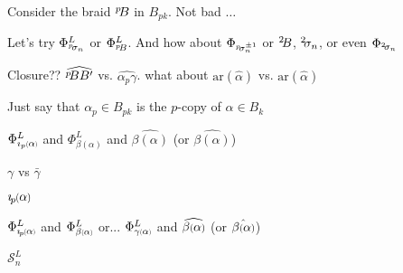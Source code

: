 \documentclass{amsart}
\newcommand{\pp}[2][-2]{\ensuremath ^{#2}\hspace*{#1 pt}}
\newcommand*{\smallp}[1]{\scalebox{.75}{\ensuremath#1}}
\newcommand*{\subsmallp}[1]{\scalebox{.5}{\ensuremath#1}}
\begin{document}
 Consider the braid $\pp p B$ in $B_{pk}$. Not bad $\ldots$

Let's try $\Phi_{\pp [-1.5]p \sigma_n}^L$ or $\Phi_{\pp [-1.5]p B}^L$. And how about $\Phi_{\pp[-1.5]p \sigma_n^{\pm1}}$ or $\pp 2 B$, $\pp 2 \sigma_n$, or even $\Phi_{\pp[-1.5]2 \sigma_n}$

Closure?? $\widehat{\pp pB B'}$ vs. $\widehat{\alpha_p\gamma}$. what about $\text{ar}(\widehat{\alpha})$ vs. $\text{ar}(\hat{\alpha})$

Just say that $\alpha_p\in B_{pk}$ is the $p$-copy of $\alpha\in B_k$

$\Phi_{\imath_p\subsmallp(\alpha\subsmallp)}^L$ and $\Phi_{\beta(\alpha)}^L$ and $\widehat{\beta(\alpha)}$ (or $\hat{\beta(\alpha)}$)

$\gamma$ vs $\bar\gamma$

$\imath_{\hspace*{-1pt}p}\hspace*{-.5pt}\smallp(\alpha\smallp)$

$\Phi_{\imath_{\hspace*{-1pt}p}\hspace*{-.5pt}\subsmallp(\alpha\subsmallp)}^L$ and $\Phi_{\beta\subsmallp(\alpha\subsmallp)}^L$ or... $\Phi_{\gamma\subsmallp(\alpha\subsmallp)}^L$ and $\widehat{\beta\smallp(\alpha\smallp)}$ (or $\hat{\beta\smallp(\alpha\smallp)}$)

$\mathscr S_n^L$
\end{document}
